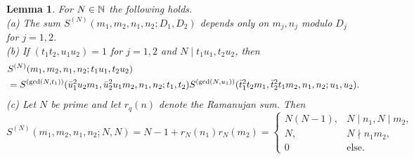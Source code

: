 \documentclass[11pt]{amsart}
\theoremstyle{plain}
\newtheorem{lemma}{Lemma}
\numberwithin{equation}{section}
\theoremstyle{definition}
\begin{document}
\begin{lemma}\label{prop1} For $N \in \Bbb{N}$ the following  holds.\\
{\rm (a)} The sum $S^{(N)}(m_1, m_2, n_1, n_2; D_1, D_2)$ depends only on $m_j, n_j$ modulo $D_j$ for $j=1, 2$. \\
{\rm (b)} If   $(t_1t_2, u_1u_2) = 1$ for $j=1, 2$ and $N \mid t_1u_1, t_2u_2$, then
\begin{displaymath}
\begin{split}
&S^{ (N)}(m_1, m_2, n_1, n_2; t_1u_1, t_2u_2) \\
&= S^{(\text{{\rm gcd}}(N, t_1))}(\bar{u}_1^2 u_2 m_1, \bar{u}_2^2 u_1 m_2, n_1, n_2; t_1,t_2) S^{({\rm gcd}(N, u_1))}(\bar{t}_1^2t_2m_1, \bar{t}_2^2t_1m_2, n_1, n_2; u_1, u_2).
\end{split}
\end{displaymath}
{\rm (c)} Let $N$ be prime and let $r_q(n)$ denote the Ramanujan sum. Then
$$S^{(N)}(m_1, m_2, n_1, n_2; N, N)= N-1 + r_N(n_1) r_N(m_2) = \begin{cases}N(N-1), & N \mid n_1, N \mid m_2,\\ N , & N \nmid n_1m_2,\\ 0 \, & \text{else.} \end{cases}$$ 
\end{lemma}
\end{document}
